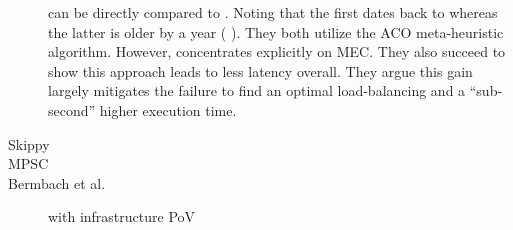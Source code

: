 \documentclass[11pt]{sdm}
\begin{document}
\begin{description}
	\item[\citet{palade_swarm-based_2020}] can be directly compared to \cite{mutichiro_qos-based_2021}. Noting that the first dates back to  whereas the latter is older by a year (  ). They both utilize the \gls{ACO} meta-heuristic algorithm. However, \cite{palade_swarm-based_2020} concentrates explicitly on \gls{MEC}. They also succeed to show this approach leads to less latency overall. They argue this gain largely mitigates the failure to find an optimal load-balancing and a ``sub-second'' higher execution time.
	
	
	
	\item[Skippy]
	\item[MPSC]
	\item[Bermbach et al.] with infrastructure PoV
\end{description}









\end{document}
